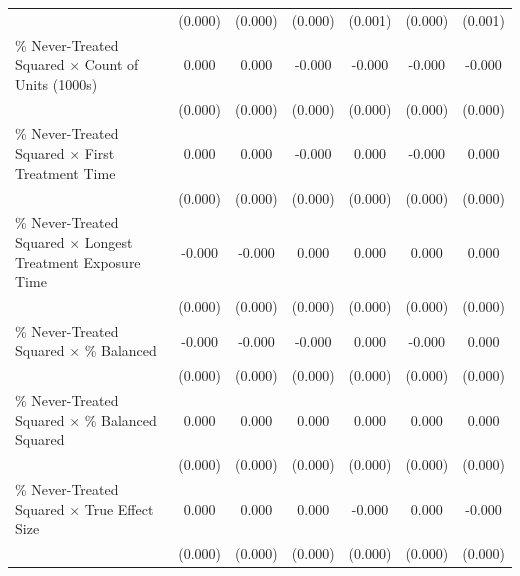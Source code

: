 \documentclass[12pt]{article}
\begin{document}
\begin{table}[htbp]
{\begin{tabular}{p{4.5in}|*{6}{c}}
                    &     (0.000)         &     (0.000)         &     (0.000)         &     (0.001)         &     (0.000)         &     (0.001)         \\
\% Never-Treated Squared $\times$ Count of Units (1000s)&       0.000         &       0.000         &      -0.000\sym{***}&      -0.000\sym{***}&      -0.000\sym{**} &      -0.000\sym{***}\\
                    &     (0.000)         &     (0.000)         &     (0.000)         &     (0.000)         &     (0.000)         &     (0.000)         \\
\% Never-Treated Squared $\times$ First Treatment Time&       0.000         &       0.000         &      -0.000\sym{***}&       0.000\sym{***}&      -0.000\sym{***}&       0.000\sym{***}\\
                    &     (0.000)         &     (0.000)         &     (0.000)         &     (0.000)         &     (0.000)         &     (0.000)         \\
\% Never-Treated Squared $\times$ Longest Treatment Exposure Time&      -0.000         &      -0.000\sym{*}  &       0.000\sym{***}&       0.000\sym{***}&       0.000\sym{***}&       0.000\sym{***}\\
                    &     (0.000)         &     (0.000)         &     (0.000)         &     (0.000)         &     (0.000)         &     (0.000)         \\
\% Never-Treated Squared $\times$ \% Balanced&      -0.000\sym{***}&      -0.000\sym{***}&      -0.000         &       0.000\sym{*}  &      -0.000         &       0.000\sym{*}  \\
                    &     (0.000)         &     (0.000)         &     (0.000)         &     (0.000)         &     (0.000)         &     (0.000)         \\
\% Never-Treated Squared $\times$ \% Balanced Squared&       0.000\sym{***}&       0.000\sym{***}&       0.000\sym{*}  &       0.000\sym{**} &       0.000\sym{**} &       0.000\sym{*}  \\
                    &     (0.000)         &     (0.000)         &     (0.000)         &     (0.000)         &     (0.000)         &     (0.000)         \\
\% Never-Treated Squared $\times$ True Effect Size&       0.000         &       0.000         &       0.000         &      -0.000         &       0.000         &      -0.000         \\
                    &     (0.000)         &     (0.000)         &     (0.000)         &     (0.000)         &     (0.000)         &     (0.000)         \\

\end{tabular}}
\end{table}
\end{document}
